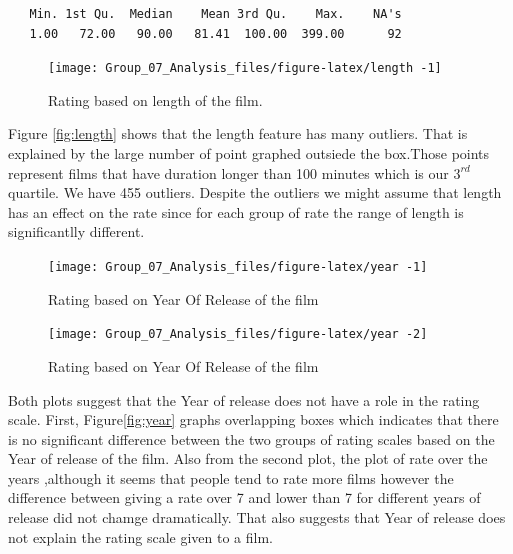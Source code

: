 \documentclass[
]{article}
\begin{document}
\begin{verbatim}
   Min. 1st Qu.  Median    Mean 3rd Qu.    Max.    NA's 
   1.00   72.00   90.00   81.41  100.00  399.00      92 
\end{verbatim}

\begin{figure}[H]

{\centering \texttt{[image: Group\_07\_Analysis\_files/figure-latex/length -1]} 

}

\caption{\label{fig:length} Rating based on length of the film.}\label{fig:length }
\end{figure}

Figure \ref{fig:length} shows that the length feature has many outliers.
That is explained by the large number of point graphed outsiede the
box.Those points represent films that have duration longer than 100
minutes which is our \(3^{rd}\) quartile. We have 455 outliers. Despite
the outliers we might assume that length has an effect on the rate since
for each group of rate the range of length is significantlly different.

\begin{figure}[H]

{\centering \texttt{[image: Group\_07\_Analysis\_files/figure-latex/year -1]} 

}

\caption{\label{fig:year} Rating based on Year Of Release of the film}\label{fig:year -1}
\end{figure}
\begin{figure}[H]

{\centering \texttt{[image: Group\_07\_Analysis\_files/figure-latex/year -2]} 

}

\caption{\label{fig:year} Rating based on Year Of Release of the film}\label{fig:year -2}
\end{figure}

Both plots suggest that the Year of release does not have a role in the
rating scale. First, Figure\ref{fig:year} graphs overlapping boxes which
indicates that there is no significant difference between the two groups
of rating scales based on the Year of release of the film. Also from the
second plot, the plot of rate over the years ,although it seems that
people tend to rate more films however the difference between giving a
rate over 7 and lower than 7 for different years of release did not
chamge dramatically. That also suggests that Year of release does not
explain the rating scale given to a film.
\end{document}
